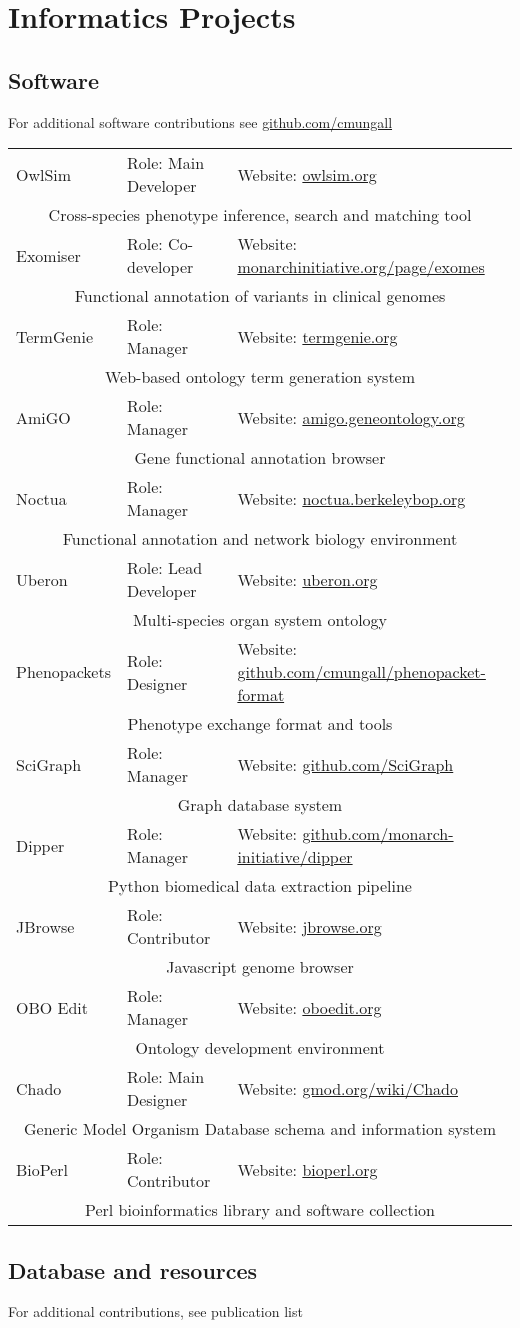 \newcommand{\pinfo}[4]{
  #1 & Role: #4 & Website: \href{http://#3}{#3} \\
\multicolumn{3}{|c|}{#2} \\
}

\section*{Informatics Projects}

\subsection*{Software}

For additional software contributions see \href{http://github.com/cmungall}{github.com/cmungall}

\begin{longtable}{p{1in} p{4in} p{2in}}

    \pinfo{OwlSim}{Cross-species phenotype inference, search and matching tool}{owlsim.org}{Main Developer}
    \pinfo{Exomiser}{Functional annotation of variants in clinical genomes}{monarchinitiative.org/page/exomes}{Co-developer}
    \pinfo{TermGenie}{Web-based ontology term generation system}{termgenie.org}{Manager}
    \pinfo{AmiGO}{Gene functional annotation browser}{amigo.geneontology.org}{Manager}
    \pinfo{Noctua}{Functional annotation and network biology environment}{noctua.berkeleybop.org}{Manager}
    \pinfo{Uberon}{Multi-species organ system ontology}{uberon.org}{Lead Developer}
    \pinfo{Phenopackets}{Phenotype exchange format and tools}{github.com/cmungall/phenopacket-format}{Designer}
    \pinfo{SciGraph}{Graph database system}{github.com/SciGraph}{Manager}
    \pinfo{Dipper}{Python biomedical data extraction pipeline}{github.com/monarch-initiative/dipper}{Manager}
    \pinfo{JBrowse}{Javascript genome browser}{jbrowse.org}{Contributor}
    \pinfo{OBO Edit}{Ontology development environment}{oboedit.org}{Manager}
    \pinfo{Chado}{Generic Model Organism Database schema and information system}{gmod.org/wiki/Chado}{Main Designer}
    \pinfo{BioPerl}{Perl bioinformatics library and software collection}{bioperl.org}{Contributor}

\end{longtable}

\subsection*{Database and resources}

For additional contributions, see publication list

